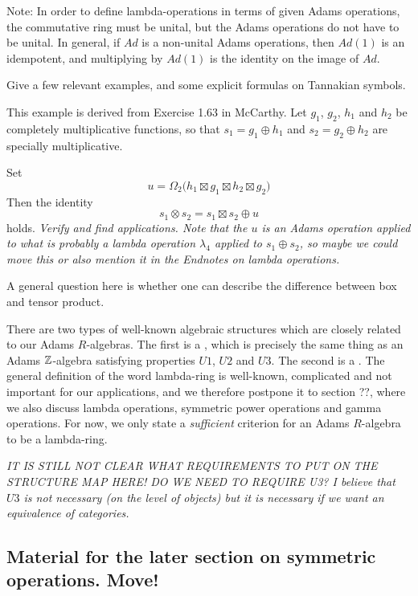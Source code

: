 Note: In order to define lambda-operations in terms of given Adams operations, the commutative ring must be unital, but the Adams operations do not have to be unital. In general, if $Ad$ is a non-unital Adams operations, then $Ad(1)$ is an idempotent, and multiplying by $Ad(1)$ is the identity on the image of $Ad$. 

Give a few relevant examples, and some explicit formulas on Tannakian symbols.

\begin{example}
This example is derived from Exercise 1.63 in McCarthy. Let $g_1$, $g_2$, $h_1$ and $h_2$ be completely multiplicative functions, so that $s_1 = g_1 \oplus h_1$ and $s_2 = g_2 \oplus h_2$ are specially multiplicative.

Set
$$  u = \Omega_2 \big(  h_1 \boxtimes g_1 \boxtimes h_2 \boxtimes g_2   \big)  $$
Then the identity 
$$   s_1 \otimes s_2 = s_1 \boxtimes s_2 \oplus u  $$
holds. \emph{Verify and find applications. Note that the $u$ is an Adams operation applied to what is probably a lambda operation $\lambda_4$ applied to $s_1 \oplus s_2$, so maybe we could move this or also mention it in the Endnotes on lambda operations.}

A general question here is whether one can describe the difference between box and tensor product.

\end{example}


There are two types of well-known algebraic structures which are closely related to our Adams $R$-algebras. The first is a  , which is precisely the same thing as an Adams $\mathbb{Z}$-algebra satisfying properties $U1$, $U2$ and $U3$. The second is a . The general definition of the word lambda-ring is well-known, complicated and not important for our applications, and we therefore postpone it to section ??, where we also discuss lambda operations, symmetric power operations and gamma operations. For now, we only state a \emph{sufficient} criterion for an Adams $R$-algebra to be a lambda-ring.

\emph{IT IS STILL NOT CLEAR WHAT REQUIREMENTS TO PUT ON THE STRUCTURE MAP HERE! DO WE NEED TO REQUIRE U3? I believe that $U3$ is not necessary (on the level of objects) but it is necessary if we want an equivalence of categories.}


\subsection*{Material for the later section on symmetric operations. Move!}


